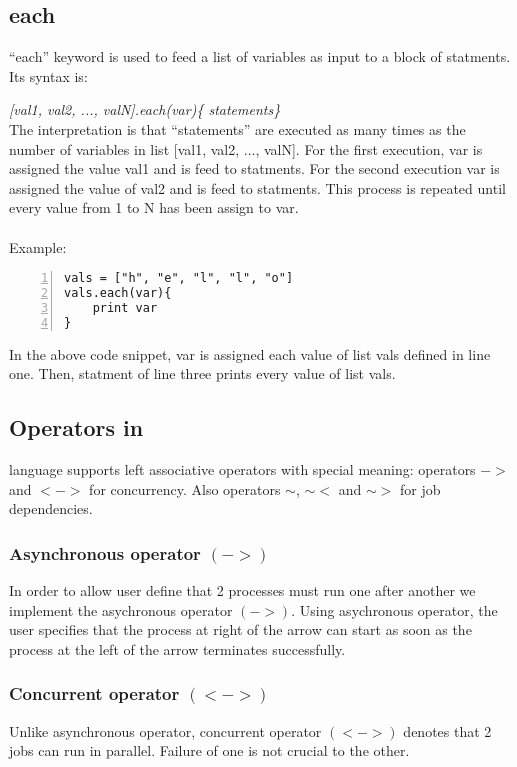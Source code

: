 \subsection*{each}

\noindent ``each'' keyword is used to feed a list of variables as input
to a block of statments. Its syntax is:

\textit{[val1, val2, ..., valN].each(var)\{ statements\}}\\

The interpretation is that ``statements'' are executed as many times as the
number of variables in list [val1, val2, ..., valN]. For the first execution, var is assigned
the value val1 and is feed to statments. For the second execution var is assigned the value
of val2 and is feed to statments. This process is repeated until every value 
from 1 to N has been assign to var.\\
\\
Example:
\begin{Verbatim}[numbers=left]
vals = ["h", "e", "l", "l", "o"]
vals.each(var){
    print var
}
\end{Verbatim}

In the above code snippet, var is assigned each value of list vals defined in line one.
Then, statment of line three prints every value of list vals.



\subsection*{Operators in \lang{}}

\lang{} language supports left associative operators with special meaning: operators $->$ and $<->$ for concurrency. 
Also operators $\sim$, $\sim<$ and $\sim>$ for job dependencies.
\subsubsection*{Asynchronous operator $(->)$}
In order to allow user define that 2 processes must run one after another
we implement the asychronous operator $(->)$. Using asychronous operator, the user
specifies that the process at right of the arrow can start as soon as
the process at the left of the arrow terminates successfully.
\subsubsection*{Concurrent operator $(<->)$}
Unlike asynchronous operator, concurrent operator $(<->)$ denotes that 2 jobs can
run in parallel. Failure of one is not crucial to the other.
